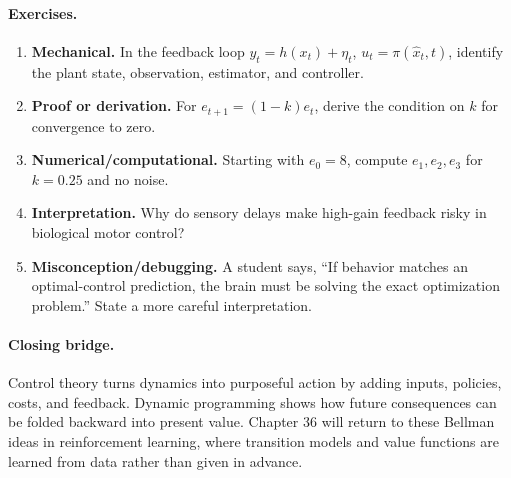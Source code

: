 \paragraph{Exercises.}
\begin{enumerate}[label=\textbf{30.4.\arabic*.}, leftmargin=*]
\item \textbf{Mechanical.} In the feedback loop \(y_t=h(x_t)+\eta_t\), \(u_t=\pi(\widehat x_t,t)\), identify the plant state, observation, estimator, and controller.
\item \textbf{Proof or derivation.} For \(e_{t+1}=(1-k)e_t\), derive the condition on \(k\) for convergence to zero.
\item \textbf{Numerical/computational.} Starting with \(e_0=8\), compute \(e_1,e_2,e_3\) for \(k=0.25\) and no noise.
\item \textbf{Interpretation.} Why do sensory delays make high-gain feedback risky in biological motor control?
\item \textbf{Misconception/debugging.} A student says, ``If behavior matches an optimal-control prediction, the brain must be solving the exact optimization problem.'' State a more careful interpretation.
\end{enumerate}

\paragraph{Closing bridge.}
Control theory turns dynamics into purposeful action by adding inputs, policies, costs, and feedback. Dynamic programming shows how future consequences can be folded backward into present value. Chapter 36 will return to these Bellman ideas in reinforcement learning, where transition models and value functions are learned from data rather than given in advance.

\clearpage

